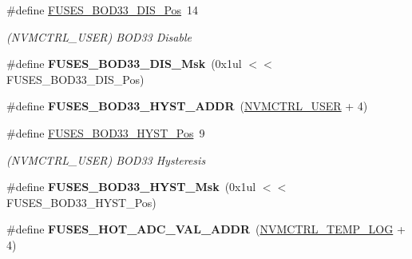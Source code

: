 \begin{DoxyCompactItemize}
\item 
\hypertarget{group__fuses__api_ga72a0920038e8fd5892ae9e4d91ae0ac3}{}\#define \hyperlink{group__fuses__api_ga72a0920038e8fd5892ae9e4d91ae0ac3}{F\+U\+S\+E\+S\+\_\+\+B\+O\+D33\+\_\+\+D\+I\+S\+\_\+\+Pos}~14\label{group__fuses__api_ga72a0920038e8fd5892ae9e4d91ae0ac3}

\begin{DoxyCompactList}\small\item\em (N\+V\+M\+C\+T\+R\+L\+\_\+\+U\+S\+E\+R) B\+O\+D33 Disable \end{DoxyCompactList}\item 
\hypertarget{group__fuses__api_gad74b7846d483860d1e91526d80d13d34}{}\#define {\bfseries F\+U\+S\+E\+S\+\_\+\+B\+O\+D33\+\_\+\+D\+I\+S\+\_\+\+Msk}~(0x1ul $<$$<$ F\+U\+S\+E\+S\+\_\+\+B\+O\+D33\+\_\+\+D\+I\+S\+\_\+\+Pos)\label{group__fuses__api_gad74b7846d483860d1e91526d80d13d34}

\item 
\hypertarget{group__fuses__api_ga527d8615ff4066ce38cd38c335b0a4e4}{}\#define {\bfseries F\+U\+S\+E\+S\+\_\+\+B\+O\+D33\+\_\+\+H\+Y\+S\+T\+\_\+\+A\+D\+D\+R}~(\hyperlink{group___s_a_m_l21_j18_a__base_ga7a7a83a5753fa323b61536e396083c99}{N\+V\+M\+C\+T\+R\+L\+\_\+\+U\+S\+E\+R} + 4)\label{group__fuses__api_ga527d8615ff4066ce38cd38c335b0a4e4}

\item 
\hypertarget{group__fuses__api_ga5ab9b1d814cf783918e8b12a908295ef}{}\#define \hyperlink{group__fuses__api_ga5ab9b1d814cf783918e8b12a908295ef}{F\+U\+S\+E\+S\+\_\+\+B\+O\+D33\+\_\+\+H\+Y\+S\+T\+\_\+\+Pos}~9\label{group__fuses__api_ga5ab9b1d814cf783918e8b12a908295ef}

\begin{DoxyCompactList}\small\item\em (N\+V\+M\+C\+T\+R\+L\+\_\+\+U\+S\+E\+R) B\+O\+D33 Hysteresis \end{DoxyCompactList}\item 
\hypertarget{group__fuses__api_gae3c35a744a83881ef64bbacce43752a9}{}\#define {\bfseries F\+U\+S\+E\+S\+\_\+\+B\+O\+D33\+\_\+\+H\+Y\+S\+T\+\_\+\+Msk}~(0x1ul $<$$<$ F\+U\+S\+E\+S\+\_\+\+B\+O\+D33\+\_\+\+H\+Y\+S\+T\+\_\+\+Pos)\label{group__fuses__api_gae3c35a744a83881ef64bbacce43752a9}

\item 
\hypertarget{group__fuses__api_gafd0f088c88270c6f6b68f1e7e49af33d}{}\#define {\bfseries F\+U\+S\+E\+S\+\_\+\+H\+O\+T\+\_\+\+A\+D\+C\+\_\+\+V\+A\+L\+\_\+\+A\+D\+D\+R}~(\hyperlink{group___s_a_m_l21_j18_a__base_gae900d443ec6d7cf1c90d21b6662fa447}{N\+V\+M\+C\+T\+R\+L\+\_\+\+T\+E\+M\+P\+\_\+\+L\+O\+G} + 4)\label{group__fuses__api_gafd0f088c88270c6f6b68f1e7e49af33d}


\end{DoxyCompactItemize}
